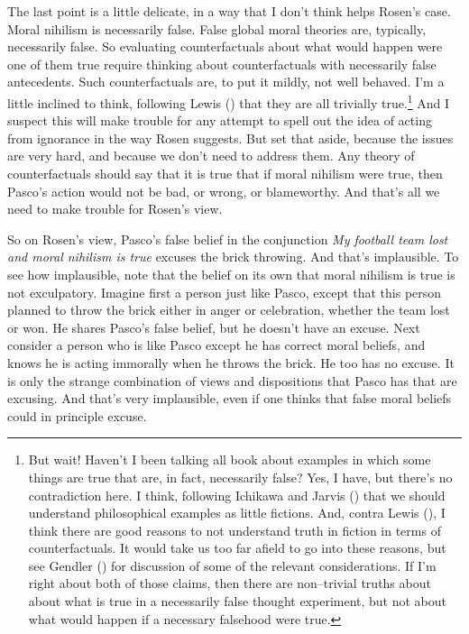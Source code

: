 \documentclass[
  10pt,
  letterpaper,
  twoside]{scrbook}
\begin{document}
The last point is a little delicate, in a way that I don't think helps
Rosen's case. Moral nihilism is necessarily false. False global moral
theories are, typically, necessarily false. So evaluating
counterfactuals about what would happen were one of them true require
thinking about counterfactuals with necessarily false antecedents. Such
counterfactuals are, to put it mildly, not well behaved. I'm a little
inclined to think, following Lewis ()
that they are all trivially true.\footnote{But wait! Haven't I been
  talking all book about examples in which some things are true that
  are, in fact, necessarily false? Yes, I have, but there's no
  contradiction here. I think, following Ichikawa and Jarvis
  () that we should understand
  philosophical examples as little fictions. And, contra Lewis
  (), I think there are good reasons to
  not understand truth in fiction in terms of counterfactuals. It would
  take us too far afield to go into these reasons, but see Gendler
  () for discussion of some of the
  relevant considerations. If I'm right about both of those claims, then
  there are non--trivial truths about about what is true in a
  necessarily false thought experiment, but not about what would happen
  if a necessary falsehood were true.} And I suspect this will make
trouble for any attempt to spell out the idea of acting from ignorance
in the way Rosen suggests. But set that aside, because the issues are
very hard, and because we don't need to address them. Any theory of
counterfactuals should say that it is true that if moral nihilism were
true, then {Pasco}'s action would not be bad, or wrong, or blameworthy.
And that's all we need to make trouble for Rosen's view.

So on Rosen's view, {Pasco}'s false belief in the conjunction \emph{My
football team lost and moral nihilism is true} excuses the brick
throwing. And that's implausible. To see how implausible, note that the
belief on its own that moral nihilism is true is not exculpatory.
Imagine first a person just like {Pasco}, except that this person
planned to throw the brick either in anger or celebration, whether the
team lost or won. He shares {Pasco}'s false belief, but he doesn't have
an excuse. Next consider a person who is like {Pasco} except he has
correct moral beliefs, and knows he is acting immorally when he throws
the brick. He too has no excuse. It is only the strange combination of
views and dispositions that {Pasco} has that are excusing. And that's
very implausible, even if one thinks that false moral beliefs could in
principle excuse.
\end{document}

